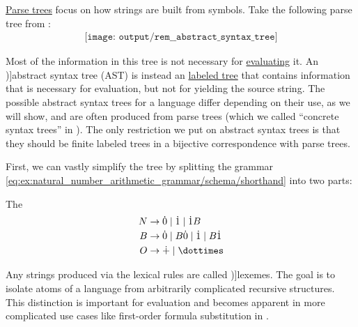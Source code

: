 \begin{concept}\label{con:abstract_syntax_tree}
  \hyperref[def:parse_tree]{Parse trees} focus on how strings are built from symbols. Take the following parse tree from :
  \begin{equation}\label{eq:con:abstract_syntax_tree/base}
    \begin{aligned}
      \texttt{[image: output/rem\_\_abstract\_syntax\_tree]}
    \end{aligned}
  \end{equation}

  Most of the information in this tree is not necessary for \hyperref[con:evaluation]{evaluating} it. An \term[en=abstract syntax tree (\cite[41]{AhoEtAl2006Compilers})]{abstract syntax tree} (AST) is instead an \hyperref[def:labeled_tree]{labeled tree} that contains information that is necessary for evaluation, but not for yielding the source string. The possible abstract syntax trees for a language differ depending on their use, as we will show, and are often produced from parse trees (which we called \enquote{concrete syntax trees} in ). The only restriction we put on abstract syntax trees is that they should be finite labeled trees in a bijective correspondence with parse trees.

  First, we can vastly simplify the tree by splitting the grammar \eqref{eq:ex:natural_number_arithmetic_grammar/schema/shorthand} into two parts:
  \begin{thmenum}
     The 
    \begin{equation*}
      \begin{aligned}
        N &\to \syn0 \mid \syn1 \mid \syn1 B \\
        B &\to \syn0 \mid B \syn0 \mid \syn1 \mid B \syn1 \\
        O &\to \synplus \mid \syntimes
      \end{aligned}
    \end{equation*}

    Any strings produced via the lexical rules are called \term[ru=лексемы (\cite[329]{Гладкий1973ГрамматикиИЯзыки})]{lexemes}. The goal is to isolate atoms of a language from arbitrarily complicated recursive structures. This distinction is important for evaluation and becomes apparent in more complicated use cases like first-order formula substitution in .


\end{thmenum}
\end{concept}
